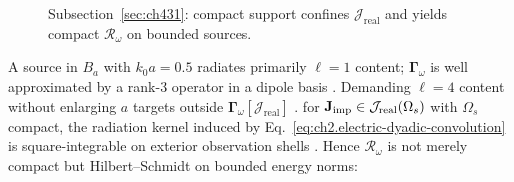\begin{figure}[t]
\centering
{}
\caption{Subsection~\ref{sec:ch431}: compact support confines \(\mathcal{J}_{\mathrm{real}}\) and yields compact
\(\mathcal{R}_\omega\) on bounded sources.}
\label{fig:ch4.compact-source-domain}
\end{figure}
A source in \(B_{a}\) with \(k_{0}a=0.5\) radiates primarily \(\ell=1\) content; \(\boldsymbol{\Gamma}_\omega\) is
well approximated by a rank-\(3\) operator in a dipole basis \cite{jackson1999}. Demanding
\(\ell=4\) content without enlarging \(a\) targets outside \(\boldsymbol{\Gamma}_\omega[\mathcal{J}_{\mathrm{real}}]\)
\cite{hansen1988}.
for \(\mathbf{J}_{\mathrm{imp}}\in\mathcal{J}_{\mathrm{real}}(\Omega_{s})\) with \(\Omega_{s}\) compact, the radiation kernel induced by
Eq.~\eqref{eq:ch2.electric-dyadic-convolution} is square-integrable on exterior observation shells
\cite{stratton1941}. Hence \(\mathcal{R}_\omega\) is not merely compact but Hilbert--Schmidt on bounded
energy norms:
